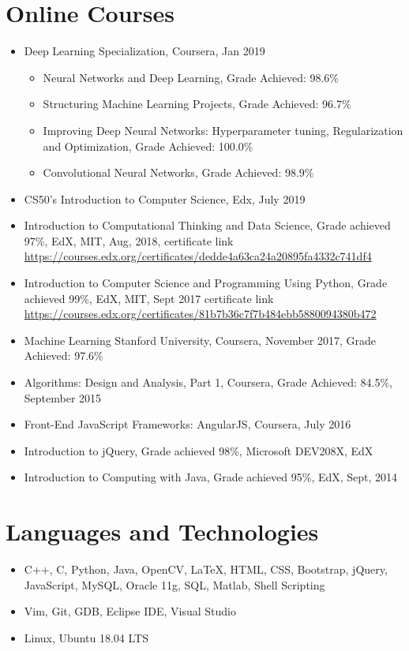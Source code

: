 \documentclass[a4paper,10pt]{article}
\begin{document}
    \section{Online Courses}
	\begin{itemize}
	        \item Deep Learning Specialization, Coursera, Jan 2019
	            \begin{itemize}
	                \item Neural Networks and Deep Learning, Grade Achieved: 98.6\%
                    \item Structuring Machine Learning Projects, Grade Achieved: 96.7\%
                    \item Improving Deep Neural Networks: Hyperparameter tuning, Regularization and Optimization, Grade Achieved: 100.0\%
                    \item Convolutional Neural Networks, Grade Achieved: 98.9\%
	            \end{itemize}
            \item CS50's Introduction to Computer Science, Edx, July 2019
	        \item Introduction to Computational Thinking and Data Science, Grade achieved 97\%, EdX, MIT, Aug, 2018, certificate link \url{https://courses.edx.org/certificates/dedde4a63ca24a20895fa4332c741df4}
	        \item Introduction to Computer Science and Programming Using Python, Grade achieved  99\%, EdX, MIT, Sept 2017 certificate link \url{https://courses.edx.org/certificates/81b7b36c7f7b484ebb5880094380b472}
	        \item Machine Learning Stanford University, Coursera, November 2017, Grade Achieved: 97.6\%
	        \item Algorithms: Design and Analysis, Part 1, Coursera, Grade Achieved: 84.5\%, September 2015
	        \item Front-End JavaScript Frameworks: AngularJS, Coursera, July 2016
	        \item Introduction to jQuery,  Grade achieved 98\%, Microsoft DEV208X, EdX
	        \item Introduction to Computing with Java, Grade achieved 95\%, EdX, Sept, 2014
	    \end{itemize}
	
	\section{Languages and Technologies}
	\begin{itemize}
        		\item C++, C, Python, Java, OpenCV, {\LaTeX}, HTML, CSS, Bootstrap, jQuery, JavaScript, MySQL, Oracle 11g, SQL, Matlab, Shell Scripting
	    	\item Vim, Git, GDB, Eclipse IDE, Visual Studio
        		\item Linux, Ubuntu 18.04 LTS
	\end{itemize}
	
\end{document}

